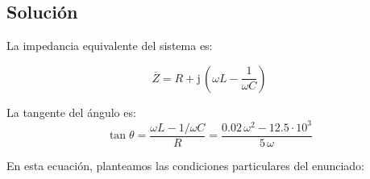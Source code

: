 \subsection*{Solución}
La impedancia equivalente del sistema es:

\begin{equation*}
  \overline{Z} = R + \mathrm{j}\, \left(\omega L - \frac{1}{\omega C}\right)
\end{equation*}

La tangente del ángulo es:
\begin{equation*}
  \tan \theta = \frac{\omega L - 1/\omega C}{R} = \frac{0.02\,\omega^2 - 12.5\cdot 10^3}{5\,\omega}
\end{equation*}

En esta ecuación, planteamos las condiciones particulares del enunciado:

